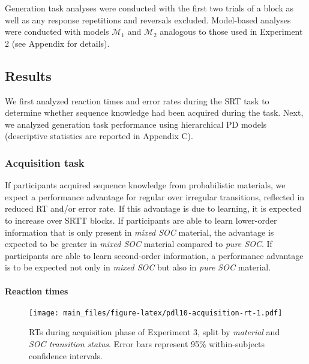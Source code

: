 \documentclass[jou]{apa6}
\theoremstyle{definition}
\theoremstyle{definition}
\theoremstyle{definition}
\theoremstyle{remark}
\begin{document}
Generation task analyses were conducted with the first two trials of a
block as well as any response repetitions and reversals excluded.
Model-based analyses were conducted with models \(\mathcal{M}_1\) and
\(\mathcal{M}_2\) analogous to those used in Experiment 2 (see Appendix
for details).

\subsection{Results}\label{results-2}

We first analyzed reaction times and error rates during the SRT task to
determine whether sequence knowledge had been acquired during the task.
Next, we analyzed generation task performance using hierarchical PD
models (descriptive statistics are reported in Appendix C).

\subsubsection{Acquisition task}\label{acquisition-task-2}

If participants acquired sequence knowledge from probabilistic
materials, we expect a performance advantage for regular over irregular
transitions, reflected in reduced RT and/or error rate. If this
advantage is due to learning, it is expected to increase over SRTT
blocks. If participants are able to learn lower-order information that
is only present in \emph{mixed SOC} material, the advantage is expected
to be greater in \emph{mixed SOC} material compared to \emph{pure SOC}.
If participants are able to learn second-order information, a
performance advantage is to be expected not only in \emph{mixed SOC} but
also in \emph{pure SOC} material.

\paragraph{Reaction times}\label{reaction-times-2}

\begin{figure}[htbp]
\centering
\texttt{[image: main\_files/figure-latex/pdl10-acquisition-rt-1.pdf]}
\caption{\label{fig:pdl10-acquisition-rt}RTs during acquisition phase of
Experiment 3, split by \emph{material} and \emph{SOC transition status}.
Error bars represent 95\% within-subjects confidence intervals.}
\end{figure}
\end{document}
